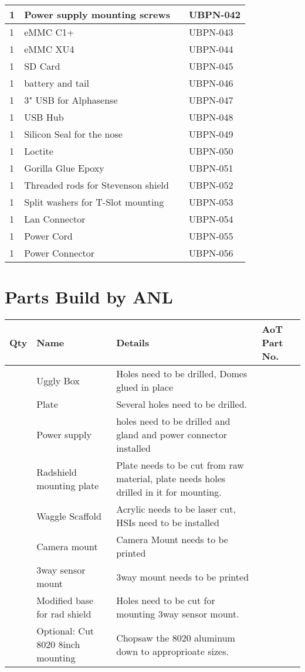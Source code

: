 \begin{longtable}{|p{}|p{}|p{}|p{}|}
1 & Power supply mounting screws &  & UBPN-042\\ \hline
1 & eMMC C1+ &  & UBPN-043\\ \hline
1 & eMMC XU4 &  & UBPN-044\\ \hline
1 & SD Card &  & UBPN-045\\ \hline
1 & battery and tail &  & UBPN-046\\ \hline
1 & 3" USB for Alphasense &  & UBPN-047\\ \hline
1 & USB Hub &  & UBPN-048\\ \hline
1 & Silicon Seal for the nose &  & UBPN-049\\ \hline
1 & Loctite &  & UBPN-050\\ \hline
1 & Gorilla Glue Epoxy &  & UBPN-051\\ \hline
1 & Threaded rods for Stevenson shield &  & UBPN-052\\ \hline
1 & Split washers for T-Slot mounting &  & UBPN-053\\ \hline
1 & Lan Connector &  & UBPN-054\\ \hline
1 & Power Cord &  & UBPN-055\\ \hline
1 & Power Connector &  & UBPN-056\\ \hline
\end{longtable}

\newpage

\section{Parts Build by ANL}
\begin{longtable}{|p{}|p{}|p{}|p{}|}
\hline
\textbf{Qty} & \textbf{Name} & \textbf{Details} & \textbf{AoT Part No.} \\ \hline
& Uggly Box & Holes need to be drilled, Domes glued in place & \\ \hline
& Plate & Several holes need to be drilled. & \\ \hline
& Power supply & holes need to be drilled and gland and power connector installed & \\ \hline
& Radshield mounting plate & Plate needs to be cut from raw material, plate needs holes drilled in it for mounting. & \\ \hline
& Waggle Scaffold & Acrylic needs to be laser cut, HSIs need to be installed & \\ \hline
& Camera mount & Camera Mount needs to be printed & \\ \hline
& 3way sensor mount & 3way mount needs to be printed & \\ \hline
& Modified base for rad shield & Holes need to be cut for mounting 3way sensor mount. & \\ \hline
& Optional: Cut 8020 8inch mounting & Chopsaw the 8020 aluminum down to approprioate sizes. & \\ \hline


\end{longtable}

